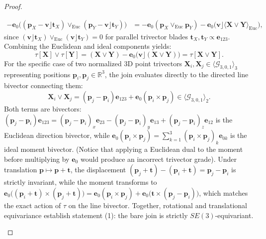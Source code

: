 \documentclass[10pt]{article}
\begin{document}
\begin{proof}
\begin{enumerate}
    \begin{align}
        -\mathbf{e}_0 \Big( (\mathbf{p}_X - \mathbf{v} \rfloor \mathbf{t}_X) \vee_{\mathrm{Euc}} (\mathbf{p}_Y - \mathbf{v} \rfloor \mathbf{t}_Y) \Big)
        &= -\mathbf{e}_0 (\mathbf{p}_X \vee_{\mathrm{Euc}} \mathbf{p}_Y) - \mathbf{e}_0 \Big( \mathbf{v} \rfloor \langle \mathbf{X} \vee \mathbf{Y} \rangle_{\mathrm{Euc}} \Big),
    \end{align}
    since $(\mathbf{v} \rfloor \mathbf{t}_X) \vee_{\mathrm{Euc}} (\mathbf{v} \rfloor \mathbf{t}_Y) = 0$ for parallel trivector blades $\mathbf{t}_X, \mathbf{t}_Y \propto \mathbf{e}_{123}$. Combining the Euclidean and ideal components yields:
    \begin{equation}
        \tau[\mathbf{X}] \vee \tau[\mathbf{Y}] = (\mathbf{X} \vee \mathbf{Y}) - \mathbf{e}_0 \big( \mathbf{v} \rfloor (\mathbf{X} \vee \mathbf{Y}) \big) = \tau[\mathbf{X} \vee \mathbf{Y}].
    \end{equation}
    For the specific case of two normalized 3D point trivectors $\mathbf{X}_i, \mathbf{X}_j \in \langle \mathcal{G}_{3,0,1} \rangle_3$ representing positions $\mathbf{p}_i, \mathbf{p}_j \in \mathbb{R}^3$, the join evaluates directly to the directed line bivector connecting them:
    \begin{equation}
        \mathbf{X}_i \vee \mathbf{X}_j = (\mathbf{p}_j - \mathbf{p}_i) \mathbf{e}_{123} + \mathbf{e}_0 (\mathbf{p}_i \times \mathbf{p}_j) \in \langle \mathcal{G}_{3,0,1} \rangle_2.
        \label{eq:join_normalized_points}
    \end{equation}
    Both terms are bivectors: $(\mathbf{p}_j - \mathbf{p}_i)\mathbf{e}_{123} = (\mathbf{p}_j - \mathbf{p}_i)_x \mathbf{e}_{23} - (\mathbf{p}_j - \mathbf{p}_i)_y \mathbf{e}_{13} + (\mathbf{p}_j - \mathbf{p}_i)_z \mathbf{e}_{12}$ is the Euclidean direction bivector, while $\mathbf{e}_0 (\mathbf{p}_i \times \mathbf{p}_j) = \sum_{k=1}^3 (\mathbf{p}_i \times \mathbf{p}_j)_k \mathbf{e}_{0k}$ is the ideal moment bivector. (Notice that applying a Euclidean dual to the moment before multiplying by $\mathbf{e}_0$ would produce an incorrect trivector grade). Under translation $\mathbf{p} \mapsto \mathbf{p} + \mathbf{t}$, the displacement $(\mathbf{p}_j + \mathbf{t}) - (\mathbf{p}_i + \mathbf{t}) = \mathbf{p}_j - \mathbf{p}_i$ is strictly invariant, while the moment transforms to $\mathbf{e}_0 \big( (\mathbf{p}_i + \mathbf{t}) \times (\mathbf{p}_j + \mathbf{t}) \big) = \mathbf{e}_0 (\mathbf{p}_i \times \mathbf{p}_j) + \mathbf{e}_0 \big( \mathbf{t} \times (\mathbf{p}_j - \mathbf{p}_i) \big)$, which matches the exact action of $\tau$ on the line bivector.
    Together, rotational and translational equivariance establish statement (1): the bare join is strictly $SE(3)$-equivariant.


\end{enumerate}
\end{proof}
\end{document}
